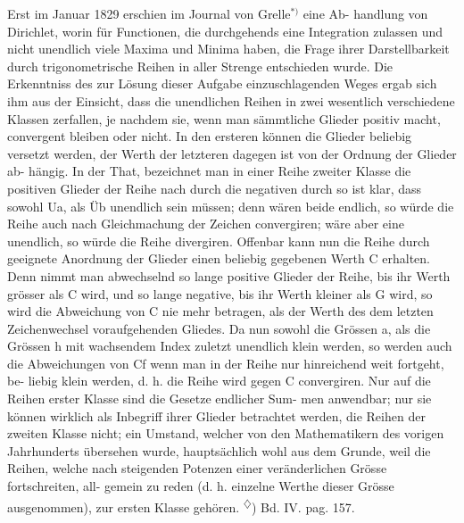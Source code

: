 \documentclass[12pt,a4paper]{book}
\theoremstyle{definition}
\theoremstyle{remark}
\begin{document}
Erst  im  Januar  1829  erschien  im  Journal  von  Grelle$^{*)}$  eine  Ab-
handlung von  Dirichlet,  worin  für  Functionen,  die  durchgehends  eine
Integration  zulassen  und  nicht  unendlich  viele  Maxima  und  Minima
haben,  die  Frage  ihrer  Darstellbarkeit  durch  trigonometrische  Reihen
in  aller  Strenge  entschieden  wurde.
Die  Erkenntniss  des  zur  Lösung  dieser  Aufgabe  einzuschlagenden
Weges  ergab  sich  ihm  aus  der  Einsicht,  dass  die  unendlichen  Reihen
in  zwei  wesentlich  verschiedene  Klassen  zerfallen,  je  nachdem  sie,
wenn  man  sämmtliche  Glieder  positiv  macht,  convergent  bleiben  oder
nicht.  In  den  ersteren  können  die  Glieder  beliebig  versetzt  werden,
der  Werth  der  letzteren  dagegen  ist  von  der  Ordnung  der  Glieder  ab-
hängig. In  der  That,  bezeichnet  man  in  einer  Reihe  zweiter  Klasse
die  positiven  Glieder  der  Reihe  nach  durch
die  negativen  durch
so  ist  klar,  dass  sowohl  Ua,  als  Üb  unendlich  sein  müssen;  denn
wären  beide  endlich,  so  würde  die  Reihe  auch  nach  Gleichmachung
der  Zeichen  convergiren;  wäre  aber  eine  unendlich,  so  würde  die  Reihe
divergiren.  Offenbar  kann  nun  die  Reihe  durch  geeignete  Anordnung
der  Glieder  einen  beliebig  gegebenen  Werth  C  erhalten.  Denn  nimmt
man  abwechselnd  so  lange  positive  Glieder  der  Reihe,  bis  ihr  Werth
grösser  als  C  wird,  und  so  lange  negative,  bis  ihr  Werth  kleiner  als
G  wird,  so  wird  die  Abweichung  von  C  nie  mehr  betragen,  als  der
Werth  des  dem  letzten  Zeichenwechsel  voraufgehenden  Gliedes.  Da
nun  sowohl  die  Grössen  a,  als  die  Grössen  h  mit  wachsendem  Index
zuletzt  unendlich  klein  werden,  so  werden  auch  die  Abweichungen
von  Cf  wenn  man  in  der  Reihe  nur  hinreichend  weit  fortgeht,  be-
liebig klein  werden,  d.  h.  die  Reihe  wird  gegen  C  convergiren.
Nur  auf  die  Reihen  erster  Klasse  sind  die  Gesetze  endlicher  Sum-
men anwendbar;  nur  sie  können  wirklich  als  Inbegriff  ihrer  Glieder
betrachtet  werden,  die  Reihen  der  zweiten  Klasse  nicht;  ein  Umstand,
welcher  von  den  Mathematikern  des  vorigen  Jahrhunderts  übersehen
wurde,  hauptsächlich  wohl  aus  dem  Grunde,  weil  die  Reihen,  welche
nach  steigenden  Potenzen  einer  veränderlichen  Grösse  fortschreiten,  all-
gemein zu  reden  (d.  h.  einzelne  Werthe  dieser  Grösse  ausgenommen),
zur  ersten  Klasse  gehören.
\textsuperscript{$\diamondsuit$})  Bd.  IV.  pag.  157.
\newpage
\end{document}
